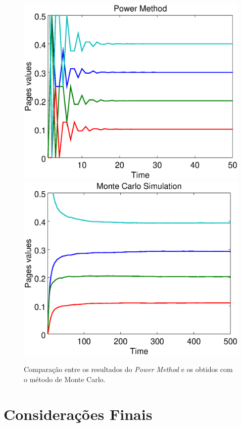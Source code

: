 \documentclass[a4paper]{report} %
\begin{document}
\
\begin{figure}[!htb]
	\centering
	\includegraphics[scale=0.3]{imagens/powermethod}
	\hspace{0.1cm}
	\includegraphics[scale=0.3]{imagens/montecarlo}
	\caption{Comparação entre os resultados do \textit{Power Method} e os obtidos com o método de Monte Carlo.}
	\label{powermonte}
\end{figure}

\section*{Considerações Finais}
\end{document}
